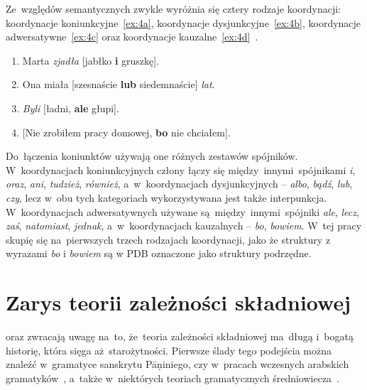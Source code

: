 \documentclass[licencjacka]{pracamgr_Kogni}
\begin{document}
    Ze~względów semantycznych zwykle wyróżnia się cztery rodzaje koordynacji: koordynacje koniunkcyjne~\ref{ex:4a}, koordynacje dysjunkcyjne~\ref{ex:4b}, koordynacje adwersatywne~\ref{ex:4c} oraz koordynacje kauzalne~\ref{ex:4d}~\citep{Haspelmath2007}.
    \begin{exe}
        \ex
        \begin{enumerate}[label=\alph{enumi}., ref=(4\alph{enumi})]
            \item {Marta \textit{zjadła} [jabłko \textbf{i} gruszkę].}
            \label {ex:4a}
            \item {Ona miała [szesnaście \textbf{lub} siedemnaście] \textit{lat}.}
            \label {ex:4b}
            \item {\textit{Byli} [ładni, \textbf{ale} głupi].}
            \label {ex:4c}
            \item {[Nie zrobiłem pracy domowej, \textbf{bo} nie chciałem].}
            \label {ex:4d}
        \end{enumerate}
        \label{ex:4}
    \end{exe}
    Do~łączenia koniunktów używają one różnych zestawów spójników.
    W~koordynacjach koniunkcyjnych człony łączy się między~innymi~spójnikami \textit{i}, \textit{oraz}, \textit{ani}, \textit{tudzież}, \textit{również}, a~w~koordynacjach dysjunkcyjnych -- \textit{albo}, \textit{bądź}, \textit{lub}, \textit{czy}, lecz w~obu tych kategoriach wykorzystywana jest także interpunkcja.
    W~koordynacjach adwersatywnych używane są~między~innymi~spójniki \textit{ale}, \textit{lecz}, \textit{zaś}, \textit{natomiast}, \textit{jednak}, a~w~koordynacjach kauzalnych -- \textit{bo}, \textit{bowiem}.
    W~tej pracy skupię się na~pierwszych trzech rodzajach koordynacji, jako że struktury z wyrazami \textit{bo} i \textit{bowiem} są w PDB oznaczone jako struktury podrzędne.


    \section{Zarys teorii zależności składniowej}\label{sec:zarys-teorii-zaleznosci-skadniowej}
     oraz \citet{Pedersen2004} zwracają uwagę na~to, że~teoria zależności składniowej ma~długą i~bogatą historię, która sięga aż~starożytności.
    Pierwsze ślady tego podejścia można znaleźć w~gramatyce sanskrytu Pāṇiniego, czy w~pracach wczesnych arabskich gramatyków~\citep{Kruijff2002}, a~także w~niektórych teoriach gramatycznych średniowiecza~\citep{Covington1984}.
\end{document}
